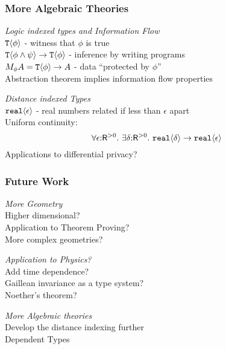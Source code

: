 \documentclass[xetex,serif,mathserif]{beamer}
\newcommand{\tyPrim}[2]{\textup{\texttt{#1}}\langle #2 \rangle}
\newenvironment{slide}[1]{\begin{frame}\frametitle{#1}}{\end{frame}}
\begin{document}
\begin{slide}{More Algebraic Theories}
  \textcolor{titlered}{\emph{Logic indexed types and Information Flow}} \\
  \quad $\tyPrim{T}{\phi}$ - witness that $\phi$ is true \\
  \quad $\tyPrim{T}{\phi \land \psi} \to \tyPrim{T}{\phi}$ - inference by writing programs \\
  \quad $M_\phi A = \tyPrim{T}{\phi} \to A$ - data ``protected by $\phi$'' \\
  \quad\quad Abstraction theorem implies information flow properties

  \pause
  \bigskip

  \textcolor{titlered}{\emph{Distance indexed Types}} \\
  \quad $\tyPrim{real}{\epsilon}$ - real numbers related if less than $\epsilon$ apart \\
  \quad Uniform continuity:
  \begin{displaymath}
    \forall \epsilon \mathord: \mathsf{R}^{>0}.\ \exists \delta\mathord: \mathsf{R}^{>0}.\ \tyPrim{real}{\delta} \to \tyPrim{real}{\epsilon}
  \end{displaymath}
  \quad Applications to differential privacy? 
\end{slide}

\begin{slide}{Future Work}
  \textcolor{titlered}{\emph{More Geometry}} \\
  \quad Higher dimensional? \\
  \quad Application to Theorem Proving? \\
  \quad More complex geometries?

  \bigskip

  \textcolor{titlered}{\emph{Application to Physics?}} \\
  \quad Add time dependence? \\
  \quad Gaillean invariance as a type system? \\
  \quad Noether's theorem?

  \bigskip

  \textcolor{titlered}{\emph{More Algebraic theories}} \\
  \quad Develop the distance indexing further \\
  \quad Dependent Types
\end{slide}
\end{document}
